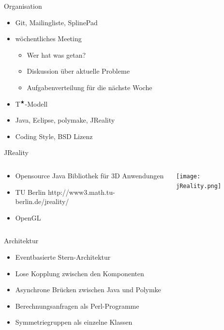 \documentclass[ucs,11pt]{beamer}
\begin{document}
\begin{frame}{Organisation}
		\begin{itemize}
			\item Git, Mailingliste, SplinePad \pause
			\item wöchentliches Meeting \pause
				\begin{itemize}
					\item Wer hat was getan?
					\item Diskussion über aktuelle Probleme
					\item Aufgabenverteilung für die nächste Woche
				\end{itemize} \pause
			\item T$^\bigstar$-Modell \pause
			\item Java, Eclipse, polymake, JReality \pause
			\item Coding Style, BSD Lizenz
		\end{itemize}
\end{frame}

\begin{frame}{JReality}

\begin{columns}
	\begin{column}{.48\textwidth}
		\begin{itemize}
			\item Opensource Java Bibliothek für 3D Anwendungen
			\item TU Berlin http://www3.math.tu-berlin.de/jreality/
			\item OpenGL
		\end{itemize}
	\end{column}%
	\hfill%
	\begin{column}{.48\textwidth}
\texttt{[image: jReality.png]}
	\end{column}%
\end{columns}
\end{frame}


\begin{frame}[t]{Architektur}
\vspace{1.5cm}
	\begin{itemize}
		\item Eventbasierte Stern-Architektur \pause
		\item Lose Kopplung zwischen den Komponenten \pause
		\item Asynchrone Brücken zwischen Java und Polymke \pause
		\item Berechnungsanfragen als Perl-Programme \pause
		\item Symmetriegruppen als einzelne Klassen
	\end{itemize}
\vspace{1cm}
\end{frame}
\end{document}
